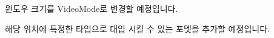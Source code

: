 
\begin{DoxyRefList}
\item[\label{todo__todo000001}%
\Hypertarget{todo__todo000001}%
클래스 \hyperlink{structcpf_1_1_render_window_create_info}{cpf\+:\+:Render\+Window\+Create\+Info} ]윈도우 크기를 Video\+Mode로 변경할 예정입니다.  
\item[\label{todo__todo000002}%
\Hypertarget{todo__todo000002}%
멤버 \hyperlink{classcpf_1_1_string_util_a965cca44ea396f01f2f3c5e3851f1001}{cpf\+:\+:String\+Util\+:\+:Format} (const String \&fmt, Args \&\&...arguments)]해당 위치에 특정한 타입으로 대입 시킬 수 있는 포멧을 추가할 예정입니다. 
\end{DoxyRefList}